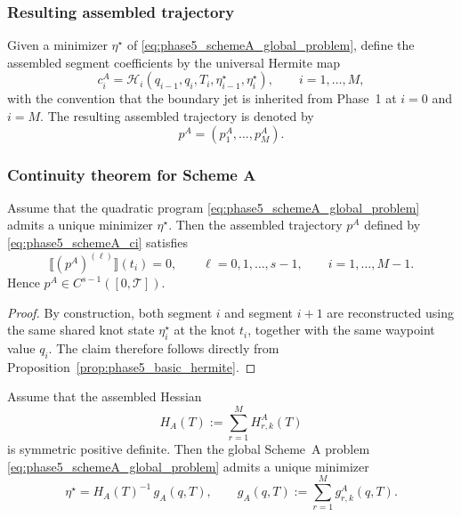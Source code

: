 \subsubsection{Resulting assembled trajectory}
\label{subsubsec:phase5_schemeA_reconstruction}

Given a minimizer \(\eta^\star\) of \eqref{eq:phase5_schemeA_global_problem}, define the assembled segment coefficients by the universal Hermite map
\begin{equation}
\label{eq:phase5_schemeA_ci}
c_i^{A}
=
\mathcal H_i(q_{i-1},q_i,T_i,\eta_{i-1}^\star,\eta_i^\star),
\qquad i=1,\dots,M,
\end{equation}
with the convention that the boundary jet is inherited from Phase~1 at \(i=0\) and \(i=M\).
The resulting assembled trajectory is denoted by
\[
p^{A}=(p_1^A,\dots,p_M^A).
\]

\subsubsection{Continuity theorem for Scheme A}
\label{subsubsec:phase5_schemeA_theorem}

\begin{theorem}
\label{thm:phase5_schemeA_continuity}
Assume that the quadratic program \eqref{eq:phase5_schemeA_global_problem} admits a unique minimizer \(\eta^\star\).
Then the assembled trajectory \(p^A\) defined by \eqref{eq:phase5_schemeA_ci} satisfies
\[
\llbracket (p^A)^{(\ell)} \rrbracket(t_i)=0,
\qquad
\ell=0,1,\dots,s-1,
\qquad
i=1,\dots,M-1.
\]
Hence \(p^A\in C^{s-1}([0,\mathcal T])\).
\end{theorem}

\begin{proof}
By construction, both segment \(i\) and segment \(i+1\) are reconstructed using the same shared knot state \(\eta_i^\star\) at the knot \(t_i\), together with the same waypoint value \(q_i\).
The claim therefore follows directly from Proposition~\ref{prop:phase5_basic_hermite}.
\end{proof}

\begin{theorem}
\label{thm:phase5_schemeA_existence}
Assume that the assembled Hessian
\begin{equation}
\label{eq:phase5_HA}
H_A(T):=\sum_{r=1}^{M} H_{r,k}^{A}(T)
\end{equation}
is symmetric positive definite.
Then the global Scheme~A problem \eqref{eq:phase5_schemeA_global_problem} admits a unique minimizer
\[
\eta^\star = H_A(T)^{-1}\,g_A(q,T),
\qquad
g_A(q,T):=\sum_{r=1}^{M} g_{r,k}^{A}(q,T).
\]
\end{theorem}

